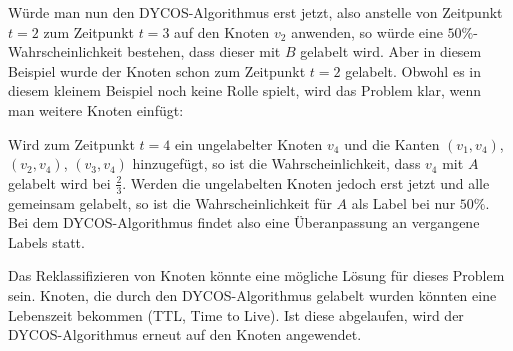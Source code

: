Würde man nun den DYCOS-Algorithmus erst jetzt, also anstelle von
Zeitpunkt $t=2$ zum Zeitpunkt $t=3$ auf den Knoten $v_2$ anwenden, so
würde eine $50\%$-Wahrscheinlichkeit bestehen, dass dieser mit $B$ 
gelabelt wird. Aber in diesem Beispiel wurde der Knoten schon
zum Zeitpunkt $t=2$ gelabelt. Obwohl es in diesem kleinem Beispiel
noch keine Rolle spielt, wird das Problem klar, wenn man weitere
Knoten einfügt:

Wird zum Zeitpunkt $t=4$ ein ungelabelter Knoten $v_4$ und die Kanten
$(v_1, v_4)$, $(v_2, v_4)$, $(v_3, v_4)$ hinzugefügt, so ist die 
Wahrscheinlichkeit, dass $v_4$ mit $A$ gelabelt wird bei $\frac{2}{3}$.
Werden die ungelabelten Knoten jedoch erst jetzt und alle gemeinsam
gelabelt, so ist die Wahrscheinlichkeit für $A$ als Label bei nur $50\%$.
Bei dem DYCOS-Algorithmus findet also eine Überanpassung an vergangene
Labels statt.

Das Reklassifizieren von Knoten könnte eine mögliche Lösung für dieses
Problem sein. Knoten, die durch den DYCOS-Algorithmus gelabelt wurden
könnten eine Lebenszeit bekommen (TTL, Time to Live). Ist diese 
abgelaufen, wird der DYCOS-Algorithmus erneut auf den Knoten angewendet.


